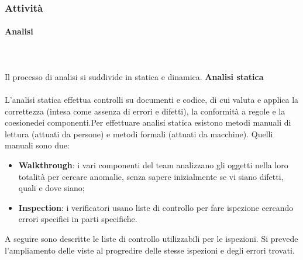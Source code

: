 	\subsubsection{Attività}
		\paragraph{Analisi} \mbox{}\\ \mbox{}\\
		Il processo di analisi si suddivide in statica e dinamica. \newline \newline
			\textbf{Analisi statica} \mbox{}\\ \mbox{}\\
			L'analisi statica effettua controlli su documenti e codice, di cui valuta e applica la correttezza (intesa come assenza di errori e difetti), la conformità a regole e la coesione\glosp dei componenti.\newline Per effettuare analisi statica esistono metodi manuali di lettura (attuati da persone) e metodi formali (attuati da macchine). Quelli manuali sono due:
			\begin{itemize}
				\item \textbf{Walkthrough}: i vari componenti del team analizzano gli oggetti nella loro totalità per cercare anomalie, senza sapere inizialmente se vi siano difetti, quali e dove siano;
				\item \textbf{Inspection}: i verificatori usano liste di controllo per fare ispezione cercando errori specifici in parti specifiche.
			\end{itemize}
			A seguire sono descritte le liste di controllo utilizzabili per le ispezioni. Si prevede l'ampliamento delle viste al progredire delle stesse ispezioni e degli errori trovati.


